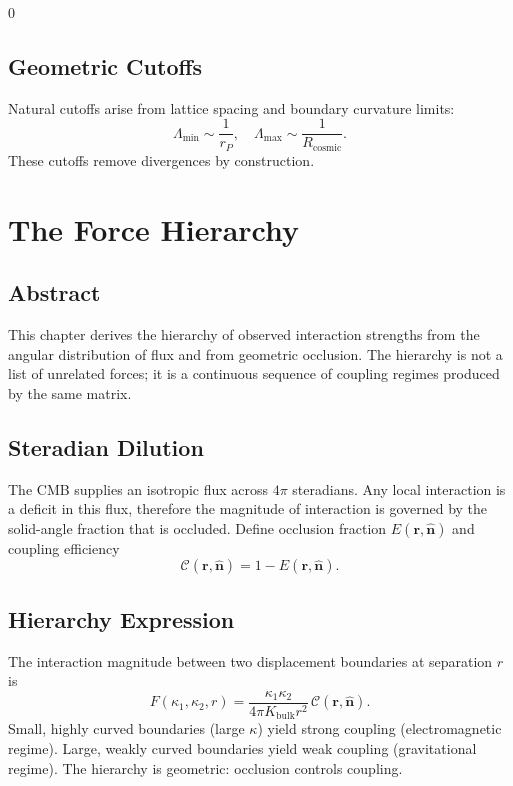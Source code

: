 0\documentclass[12pt]{book}
\begin{document}
\section{Geometric Cutoffs}
Natural cutoffs arise from lattice spacing and boundary curvature limits:
\begin{equation}
\Lambda_{\text{min}} \sim \frac{1}{r_P}, \quad \Lambda_{\text{max}} \sim \frac{1}{R_{\text{cosmic}}}.
\end{equation}
These cutoffs remove divergences by construction.

\chapter{The Force Hierarchy}

\section*{Abstract}
This chapter derives the hierarchy of observed interaction strengths from the angular distribution of
flux and from geometric occlusion. The hierarchy is not a list of unrelated forces; it is a continuous
sequence of coupling regimes produced by the same matrix.

\section{Steradian Dilution}
The CMB supplies an isotropic flux across $4\pi$ steradians. Any local interaction is a deficit in this
flux, therefore the magnitude of interaction is governed by the solid-angle fraction that is occluded.
Define occlusion fraction $E(\mathbf{r},\hat{\mathbf{n}})$ and coupling efficiency
\begin{equation}
\mathcal{C}(\mathbf{r},\hat{\mathbf{n}}) = 1 - E(\mathbf{r},\hat{\mathbf{n}}).
\end{equation}

\section{Hierarchy Expression}
The interaction magnitude between two displacement boundaries at separation $r$ is
\begin{equation}
F(\kappa_1,\kappa_2,r) = \frac{\kappa_1 \kappa_2}{4\pi K_{\text{bulk}} r^2}\,\mathcal{C}(\mathbf{r},\hat{\mathbf{n}}).
\end{equation}
Small, highly curved boundaries (large $\kappa$) yield strong coupling (electromagnetic regime). Large,
weakly curved boundaries yield weak coupling (gravitational regime). The hierarchy is geometric:
occlusion controls coupling.
\end{document}
